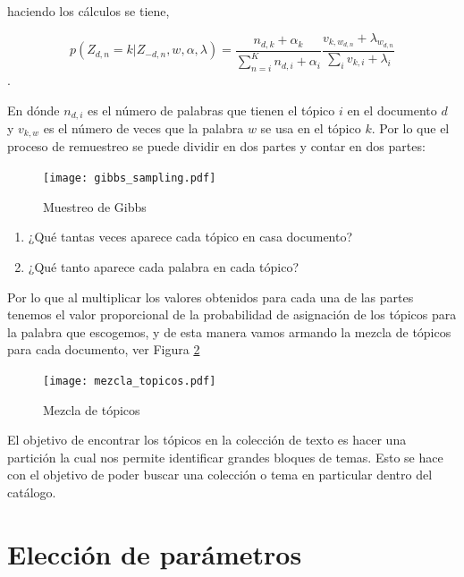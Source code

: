 \vspace{0.5cm}

haciendo los  cálculos se tiene,

\[ p(Z_{d,n}=k | Z_{-d,n}, w, \alpha, \lambda)= \frac{n_{d,k}+\alpha_k}{\sum_{n=i}^{K}n_{d,i}+\alpha_i} \frac{v_{k,w_{d,n}}+\lambda_{w_{d,n}}}{\sum_i v_{k,i}+\lambda_i}\].



En dónde $n_{d,i}$ es el número de palabras que tienen el tópico $i$ en el documento $d$ y $v_{k,w}$ es el número de veces que la palabra $w$ se usa en el tópico $k$. Por lo que el proceso de remuestreo se puede dividir en dos partes y contar en dos partes:


\begin{figure}[h]\centering
\texttt{[image: gibbs\_sampling.pdf]}
\caption{Muestreo de Gibbs}
\label{fig:Gibbs_sample}
\end{figure}

\newpage

\begin{enumerate}
  \item ¿Qué tantas veces aparece cada tópico en casa documento?
  \item ¿Qué tanto aparece cada palabra en cada tópico?
\end{enumerate}

Por lo que al multiplicar los valores obtenidos para cada una de las partes tenemos el valor proporcional de la probabilidad de asignación de los tópicos para la palabra que escogemos, y de esta manera vamos armando la mezcla de tópicos para cada documento, ver Figura \ref{fig:mezcla_topicos}


\begin{figure}[h]\centering
\texttt{[image: mezcla\_topicos.pdf]}
\caption{Mezcla de tópicos}
\label{fig:mezcla_topicos}
\end{figure}



\noindent El objetivo de encontrar los tópicos en la colección de texto es hacer una partición la cual nos permite identificar grandes bloques de temas. Esto se hace con el objetivo de poder buscar una colección o tema en particular dentro del catálogo. 



\section{Elección de parámetros} %

